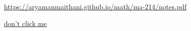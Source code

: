 \documentclass{memoir}
\begin{document}
	\begin{vplace}
		\begin{huge}
			\url{https://aryamanmaithani.github.io/math/ma-214/notes.pdf}
		\end{huge}
	\end{vplace}
	\begin{flushright}
		\begin{small}
			\href{https://www.youtube.com/watch?v=dQw4w9WgXcQ}{don't click me}
		\end{small}
	\end{flushright}
\end{document}
